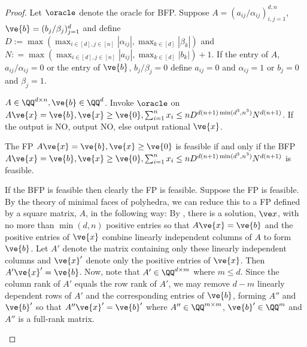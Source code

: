 \begin{proof}
Let $\oracle$ denote the oracle for BFP. Suppose $A = (a_{ij}/\alpha_{ij})_{i,j = 1}^{d,n}$, $\ve{b} = (b_j/\beta_j)_{j=1}^d$ and define $D := \max(\max_{i \in [d], j \in [n]} |\alpha_{ij}|, \max_{k \in [d]} |\beta_k|)$ and $N : =  \max(\max_{i \in [d], j \in [n]} |a_{ij}|, \max_{k \in [d]} |b_k|)+1$.  If the entry of $A$, $a_{ij}/\alpha_{ij} = 0$ or the entry of $\ve{b}$, $b_j/\beta_j = 0$ define $a_{ij} = 0$ and $\alpha_{ij}=1$ or $b_j = 0$ and $\beta_j = 1$.
\begin{algorithmic}
\Require $A \in \QQ^{d \times n}, \ve{b} \in \QQ^{d}$.
\State Invoke $\oracle$ on $A\ve{x} = \ve{b}, \ve{x} \ge \ve{0}, \sum_{i=1}^n x_i \le n D^{d(n+1)\min(d^3,n^3)}N^{d(n+1)}$.  If the output is NO, output NO, else output rational $\ve{x}$.
\end{algorithmic}

\begin{claim}  
The FP $A\ve{x} = \ve{b}, \ve{x} \ge \ve{0}$ is feasible if and only if the BFP $A\ve{x} = \ve{b}, \ve{x} \ge \ve{0}, \sum_{i=1}^n x_i \le n D^{d(n+1)\min(d^3,n^3)}N^{d(n+1)}$ is feasible.
\end{claim}

\begin{claimproof}  
If the BFP is feasible then clearly the FP is feasible.  Suppose the FP is feasible.  
By the theory of minimal faces of polyhedra, we can reduce this to a FP defined by a square matrix, $A$, in the following way:  
By \cite[Theorem 1.1]{chernikov1965convolution}, there is a solution, $\ve x$, with no more than $\min(d,n)$ positive entries so that $A\ve{x} = \ve{b}$ and the positive entries of $\ve{x}$ combine linearly independent columns of $A$ to form $\ve{b}$.  
Let $A'$ denote the matrix containing only these linearly independent columns and $\ve{x}'$ denote only the positive entries of $\ve{x}$.  Then $A' \ve{x}' = \ve{b}$.  Now, note that $A' \in \QQ^{d \times m}$ where $m \le d$.  Since the column rank of $A'$ equals the row rank of $A'$, we may remove $d-m$ linearly dependent rows of $A'$ and the corresponding entries of $\ve{b}$, forming $A''$ and $\ve{b}'$ so that $A'' \ve{x}' = \ve{b}'$ where $A'' \in \QQ^{m \times m}$, $\ve{b}' \in \QQ^{m}$ and $A''$ is a full-rank matrix.


\end{claimproof}
\end{proof}
